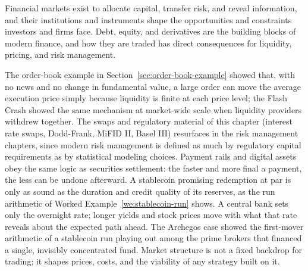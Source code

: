 \documentclass[../ai_in_finance]{subfiles}
\begin{document}

Financial markets exist to allocate capital, transfer risk, and reveal information, and their institutions and instruments shape the opportunities and constraints investors and firms face. Debt, equity, and derivatives are the building blocks of modern finance, and how they are traded has direct consequences for liquidity, pricing, and risk management.

The order-book example in Section~\ref{sec:order-book-example} showed that, with no news and no change in fundamental value, a large order can move the average execution price simply because liquidity is finite at each price level; the Flash Crash showed the same mechanism at market-wide scale when liquidity providers withdrew together.
The swaps and regulatory material of this chapter (interest rate swaps, Dodd-Frank, MiFID II, Basel III) resurfaces in the risk management chapters, since modern risk management is defined as much by regulatory capital requirements as by statistical modeling choices.
Payment rails and digital assets obey the same logic as securities settlement: the faster and more final a payment, the less can be undone afterward. A stablecoin promising redemption at par is only as sound as the duration and credit quality of its reserves, as the run arithmetic of Worked Example~\ref{we:stablecoin-run} shows.
A central bank sets only the overnight rate; longer yields and stock prices move with what that rate reveals about the expected path ahead. The Archegos case showed the first-mover arithmetic of a stablecoin run playing out among the prime brokers that financed a single, invisibly concentrated fund.
Market structure is not a fixed backdrop for trading; it shapes prices, costs, and the viability of any strategy built on it.

\end{document}
